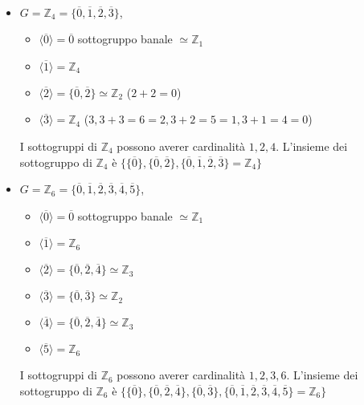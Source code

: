 \documentclass[../main.tex]{subfiles}
\begin{document}
\begin{example}
    \
    \begin{itemize}
        \item $G = \mathbb{Z}_4 = \{\overline{0}, \overline{1}, \overline{2}, \overline{3}\}$, \
              \begin{itemize}
                  \item $\langle \overline{0} \rangle = {\overline{0}}$ sottogruppo banale $\simeq \mathbb{Z}_1$
                  \item $\langle \overline{1} \rangle = \mathbb{Z}_4$
                  \item $\langle \overline{2} \rangle = \{\overline{0}, \overline{2}\} \simeq \mathbb{Z}_2$ ($2+2=0$)
                  \item $\langle \overline{3} \rangle = \mathbb{Z}_4$ ($3 , 3+3=6=2, 3+2=5=1, 3+1=4=0$)
              \end{itemize}
              I sottogruppi di $\mathbb{Z}_4$ possono averer cardinalità $1,2,4$. L'insieme
              dei sottogruppo di $\mathbb{Z}_4$ è $\{\{\overline{0}\}, \{\overline{0}, \overline{2}\},
                  \{\overline{0}, \overline{1}, \overline{2}, \overline{3}\}= \mathbb{Z}_4\}$
        \item $G = \mathbb{Z}_6 = \{\overline{0}, \overline{1}, \overline{2}, \overline{3}, \overline{4}, \overline{5}\}$, \
              \begin{itemize}
                  \item $\langle \overline{0} \rangle = {\overline{0}}$ sottogruppo banale $\simeq \mathbb{Z}_1$
                  \item $\langle \overline{1} \rangle = \mathbb{Z}_6$
                  \item $\langle \overline{2} \rangle = \{\overline{0}, \overline{2}, \overline{4}\} \simeq \mathbb{Z}_3$
                  \item $\langle \overline{3} \rangle = \{\overline{0}, \overline{3}\} \simeq \mathbb{Z}_2$
                  \item $\langle \overline{4} \rangle = \{\overline{0}, \overline{2}, \overline{4}\} \simeq \mathbb{Z}_3$
                  \item $\langle \overline{5} \rangle = \mathbb{Z}_6$
              \end{itemize}
              I sottogruppi di $\mathbb{Z}_6$ possono averer cardinalità $1,2,3,6$. L'insieme dei sottogruppo di $\mathbb{Z}_6$ è $\{\{\overline{0}\}, \{\overline{0}, \overline{2}, \overline{4}\}, \{\overline{0}, \overline{3}\}, \{\overline{0}, \overline{1}, \overline{2}, \overline{3}, \overline{4}, \overline{5}\}= \mathbb{Z}_6\}$
    \end{itemize}
\end{example}
\end{document}
